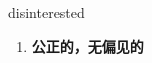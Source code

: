 
\begin{frame}
{\huge disinterested}
\begin{center}
\begin{enumerate}\Large
  \item \textbf{公正的，无偏见的}
\end{enumerate}
\end{center}
\end{frame}
